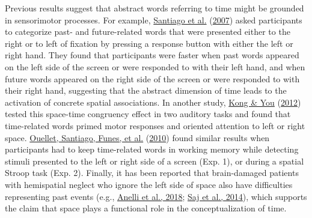 \documentclass[
  a4paper,12pt,twoside,onecolumn,openright,final,oldfontcommands]{memoir}
\begin{document}
Previous results suggest that abstract words referring to time might be grounded in sensorimotor processes. For example, \protect\hyperlink{ref-santiago_time_2007}{Santiago et al.} (\protect\hyperlink{ref-santiago_time_2007}{2007}) asked participants to categorize past- and future-related words that were presented either to the right or to left of fixation by pressing a response button with either the left or right hand. They found that participants were faster when past words appeared on the left side of the screen or were responded to with their left hand, and when future words appeared on the right side of the screen or were responded to with their right hand, suggesting that the abstract dimension of time leads to the activation of concrete spatial associations. In another study, \protect\hyperlink{ref-kong_space-time_2012}{Kong \& You} (\protect\hyperlink{ref-kong_space-time_2012}{2012}) tested this space-time congruency effect in two auditory tasks and found that time-related words primed motor responses and oriented attention to left or right space. \protect\hyperlink{ref-ouellet_thinking_2010}{Ouellet, Santiago, Funes, et al.} (\protect\hyperlink{ref-ouellet_thinking_2010}{2010}) found similar results when participants had to keep time-related words in working memory while detecting stimuli presented to the left or right side of a screen (Exp. 1), or during a spatial Stroop task (Exp. 2). Finally, it has been reported that brain-damaged patients with hemispatial neglect who ignore the left side of space also have difficulties representing past events (e.g., \protect\hyperlink{ref-anelli_effects_2018}{Anelli et al., 2018}; \protect\hyperlink{ref-saj_patients_2014}{Saj et al., 2014}), which supports the claim that space plays a functional role in the conceptualization of time.
\end{document}
